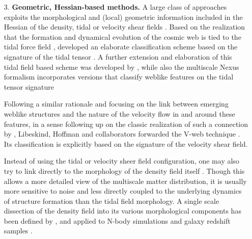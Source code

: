 \begin{itemize}
\item[3.] {\bf Geometric, Hessian-based methods.} A large class of approaches exploits the morphological and (local) geometric  information included in the Hessian of the density, tidal or velocity shear fields
\citep[e.g.][]{Aragon-Calvo2007,Hahn2007,Forero-Romero2009a,Bond2010a,Cautun2013}. Based on the realization that the formation and 
dynamical evolution of the cosmic web is tied to the tidal force field \citep[see][]{Bond1996}, \cite{Hahn2007} 
developed an elaborate classification scheme based on the signature of the tidal tensor \citep[also see][]{Hahn2007b}. 
A further extension and elaboration of this tidal field based scheme was developed by \cite{Forero-Romero2009a}, while also the 
multiscale Nexus formalism incorporates versions that classify weblike features on the tidal tensor signature \citep[][see below]{Cautun2013}

Following a similar rationale and focusing on the link between emerging weblike structures and the nature of the 
velocity flow in and around these features, in a sense following up on the classic realization of such a connection by \cite{Zeldovich1970}, 
Libeskind, Hoffman and collaborators forwarded the V-web technique \citep{Hoffman2012a, Forero-Romero2009a, Libeskind2013}. Its classification is explicitly based on the 
signature of the velocity shear field. 

Instead of using the tidal or velocity sheer field configuration, one may also try to link directly to the morphology of the density field itself 
\citep{Aragon-Calvo2007,Bond2010a,Cautun2013}. Though this allows a more detailed view of the  multiscale matter distribution, it 
is usually more sensitive to noise and less directly coupled to the underlying dynamics of structure formation than the tidal field morphology. 
A single scale dissection of the density field into its various morphological components has been defined by \cite{Bond2010a}, and applied to N-body 
simulations and galaxy redshift samples \citep[also see][]{Bond2010a,Bond2010b,Choi2010}. 


\end{itemize}
